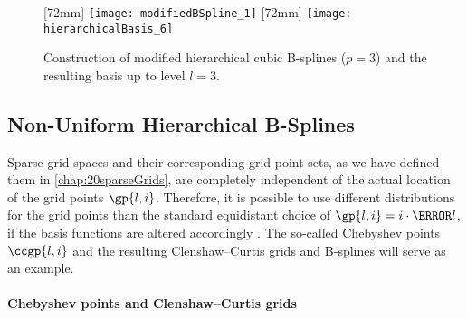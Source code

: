 \begin{figure}
  [72mm]{%
    \texttt{[image: modifiedBSpline\_1]}%
  }%
  \hfill%
  [72mm]{%
    \texttt{[image: hierarchicalBasis\_6]}%
  }%
  \caption[%
    Modified hierarchical B-splines%
  ]{%
    Construction of modified hierarchical cubic B-splines ($p = 3$) and
    the resulting basis up to level $l = 3$.%
  }%
  \label{fig:modifiedBSpline}%
\end{figure}



\subsection{Non-Uniform Hierarchical B-Splines}
\label{sec:314nonUniform}

Sparse grid spaces and their corresponding grid point sets,
as we have defined them in \cref{chap:20sparseGrids},
are completely independent of the actual location of the grid points
$\gp{l,i}$.
Therefore, it is possible to use different distributions for the grid points
than the standard equidistant choice of $\gp{l,i} = i \cdot \ms{l}$,
if the basis functions are altered accordingly
\cite{Valentin14Hierarchische}.
The so-called Chebyshev points $\ccgp{l,i}$ and the
resulting Clenshaw--Curtis grids and B-splines will serve as an example.

\paragraph{Chebyshev points and Clenshaw--Curtis grids}

